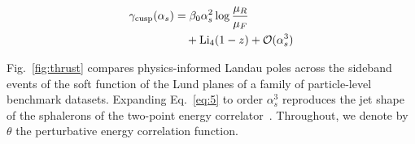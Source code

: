 \begin{align}
  \gamma_{\rm cusp}(\alpha_s) &= \beta_0 \alpha_s^2 \log\frac{\mu_R}{\mu_F} \nonumber \\
  &\quad + \mathrm{Li}_{4}(1 - z) + \mathcal{O}(\alpha_s^3) \label{eq:7}
\end{align}

Fig.~\ref{fig:thrust} compares physics-informed Landau poles across the
sideband events of the soft function of the Lund planes of a family of
particle-level benchmark datasets. Expanding Eq.~\eqref{eq:5} to order
$\alpha_s^3$ reproduces the jet shape of the sphalerons of the two-point
energy
correlator~\cite{TPC:1064-Antenna-Showers-for-the-Generalized-Parton-Distribution-at-Next-to-Leading-Power-September-29-2026}.
Throughout, we denote by $\theta$ the perturbative energy correlation
function.

